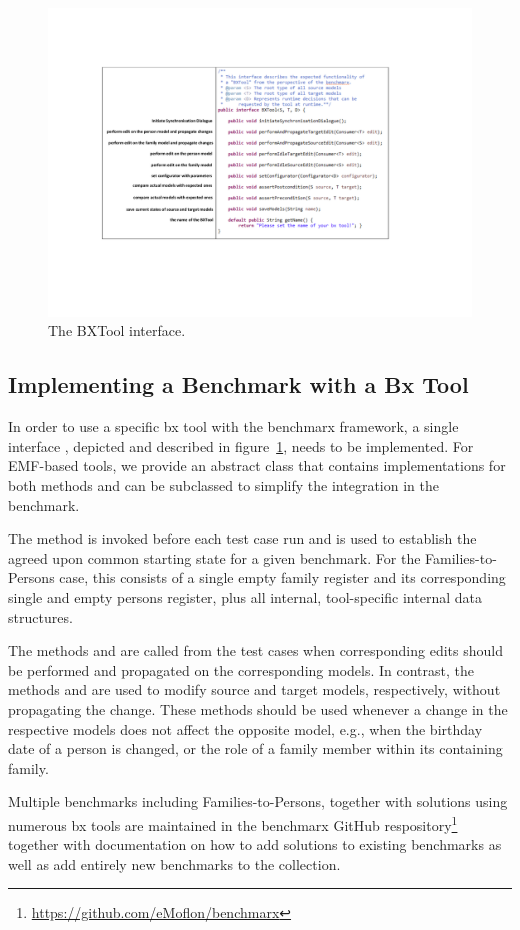 \begin{figure}[tb!]
	\centering
	\includegraphics[width=\columnwidth]{diagrams/BXTool}
	\caption{The BXTool interface.}
	\label{fig:refImplementation}
\end{figure}

\subsection{Implementing a Benchmark with a Bx Tool}

In order to use a specific bx tool with the benchmarx framework, a single interface , depicted and described in figure~\ref{fig:refImplementation}, needs to be implemented. 
For EMF-based tools, we provide an abstract class  that contains implementations for both  methods and can be subclassed to simplify the integration in the benchmark.

The method  is invoked before each test case run and is used to establish the agreed upon common starting state for a given benchmark.
For the Families-to-Persons case, this consists of a single empty family register and its corresponding single and empty persons register, plus all internal, tool-specific internal data structures. 

The methods  and  are called from the test cases when corresponding edits should be performed and propagated on the corresponding models. 
In contrast, the methods  and  are used to modify source and target models, respectively, without propagating the change.
These methods should be used whenever a change in the respective models does not affect the opposite model, e.g., when the birthday date of a person is changed, or the role of a family member within its containing family.

Multiple benchmarks including Families-to-Persons, together with solutions using numerous bx tools are maintained in the benchmarx GitHub respository\footnote{\url{https://github.com/eMoflon/benchmarx}} together with documentation on how to add solutions to existing benchmarks as well as add entirely new benchmarks to the collection.